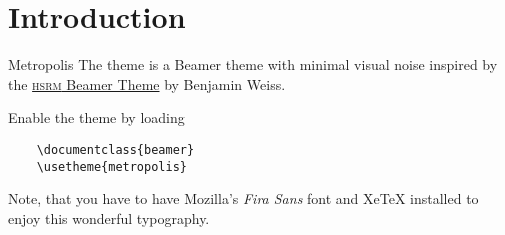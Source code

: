 \section{Introduction}

\begin{frame}[fragile]{Metropolis}
  The \themename theme is a Beamer theme \cite{greenwade93} with minimal visual noise
  inspired by the \href{https://github.com/hsrmbeamertheme/hsrmbeamertheme}{\textsc{hsrm} Beamer
  Theme} by Benjamin Weiss. \cite{Er01}

  Enable the theme \cite{Simpson} by loading

  \begin{verbatim}    \documentclass{beamer}
    \usetheme{metropolis}\end{verbatim}

  Note, that you have to have Mozilla's \emph{Fira Sans} font and XeTeX
  installed to enjoy this wonderful typography.
\end{frame}